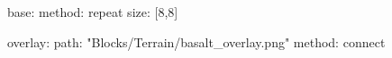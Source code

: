 base:
  method: repeat
  size: [8,8]

overlay:
  path: "Blocks/Terrain/basalt_overlay.png"
  method: connect